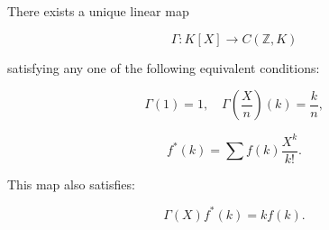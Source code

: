 There exists a unique linear map

$$\Gamma: K[X] \to C(\mathbb{Z}, K)$$

satisfying any one of the following equivalent conditions:

$$\Gamma(1) = 1, \quad \Gamma\left(\frac{X}{n}\right)(k) = \frac{k}{n},$$

$$f^*(k) = \sum f(k) \frac{X^k}{k!}.$$

This map also satisfies:

$$\Gamma(X) f^*(k) = k f(k).$$
